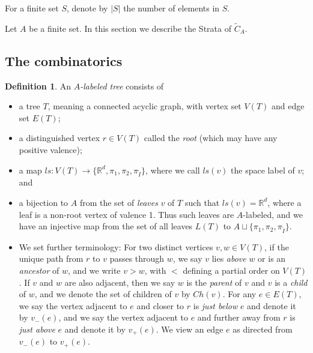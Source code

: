 \documentclass[11pt]{article}
\theoremstyle{definition}
\newtheorem{dfn}[thm]{Definition}
\theoremstyle{remark}
\def\wt#1{\widetilde{#1}}
\def\R{\mathbb{R}}
\def\rI{{\mathring{I}}}
\def\Ch{{{Ch}}}
\begin{document}
For a finite set $S$, denote by $|S|$ the number of elements in $S$. 

Let $A$ be a finite set.  In this section we describe the Strata of $\wt{C}_A$. 

\subsection{The combinatorics}
\begin{dfn}An {\it $A$-labeled tree} consists of
\begin{itemize}
\item
a tree $T$, meaning a connected acyclic graph, with vertex set $V(T)$ and edge set $E(T)$;

\item 
a distinguished vertex $r\in V(T)$ called the {\em root} (which may have any positive valence); 


\item 
a map $ls: V(T) \to \{\R^d, \pi_1, \pi_2,\pi_\rI \}$, where we call $ls(v)$ the space label of $v$; and

\item
a bijection to $A$ from the set of {\em leaves} $v$ of $T$ such that $ls(v)=\R^d$, where a leaf is a non-root vertex of valence 1.  Thus such leaves are $A$-labeled, and we have an injective map from the set of all leaves $L(T)$ to $A\sqcup \{\pi_1, \pi_2,\pi_\rI \}$.

\item
We set further terminology:  For two distinct vertices $v, w\in V(T)$, if the unique path from $r$ to $v$ passes through $w$, %
we say $v$ lies {\em above} $w$ or is an {\em ancestor} of $w$, and we write $v>w$, with $<$ defining a partial order on $V(T)$.  If $v$ and $w$ are also adjacent, then we say $w$ is the {\it parent} of $v$ and $v$ is a {\it child} of $w$, and we denote the set of children of $v$ by 
$\Ch(v)$.
For any $e\in E(T)$, we say the vertex adjacent to $e$ and closer to $r$ is {\it just below} $e$ and denote it by $v_-(e)$, and we say the vertex adjacent to $e$ and further away from $r$ is {\it just above} $e$ and denote it by $v_+(e)$.  
We view an edge $e$ as directed from $v_-(e)$ to $v_+(e)$.


\end{itemize}
\end{dfn}
\end{document}
